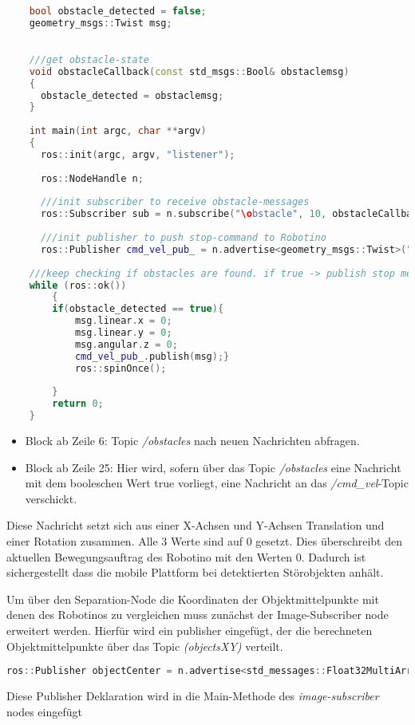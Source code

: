 	\newpage
	\begin{lstlisting}[language=C++]

	bool obstacle_detected = false;
	geometry_msgs::Twist msg;
	

	///get obstacle-state
	void obstacleCallback(const std_msgs::Bool& obstaclemsg)
	{
	  obstacle_detected = obstaclemsg;
	}
	
	int main(int argc, char **argv)
	{
	  ros::init(argc, argv, "listener");
	
	  ros::NodeHandle n;
	
      ///init subscriber to receive obstacle-messages
	  ros::Subscriber sub = n.subscribe("\obstacle", 10, obstacleCallback);
	
	  ///init publisher to push stop-command to Robotino
	  ros::Publisher cmd_vel_pub_ = n.advertise<geometry_msgs::Twist>("/cmd_vel", 1, true);
	
	///keep checking if obstacles are found. if true -> publish stop message
	while (ros::ok())
		{
		if(obstacle_detected == true){
			msg.linear.x = 0;
			msg.linear.y = 0;
			msg.angular.z = 0;
			cmd_vel_pub_.publish(msg);}
			ros::spinOnce();
	
		}
		return 0;
	}

	\end{lstlisting}
	
	\begin{itemize}
	\item Block ab Zeile 6: Topic \textit{/obstacles} nach neuen Nachrichten abfragen.
	\item Block ab Zeile 25: Hier wird, sofern über das Topic \textit{/obstacles} eine Nachricht mit dem booleschen Wert true vorliegt, eine Nachricht an das \textit{/cmd\_vel}-Topic verschickt.
	\end{itemize}
	 Diese Nachricht setzt sich aus einer X-Achsen und Y-Achsen Translation und einer Rotation zusammen. Alle 3 Werte sind auf 0 gesetzt. Dies überschreibt den aktuellen Bewegungsauftrag des Robotino mit den Werten 0. Dadurch ist sichergestellt dass die mobile Plattform bei detektierten Störobjekten anhält.
	 
	 Um über den Separation-Node die Koordinaten der Objektmittelpunkte mit denen des Robotinos zu vergleichen muss zunächst der Image-Subscriber node erweitert werden. Hierfür wird ein publisher eingefügt, der die berechneten Objektmittelpunkte über das Topic \textit{(objectsXY)} verteilt.
	 \begin{lstlisting}[language = C++]	 
	 ros::Publisher objectCenter = n.advertise<std_messages::Float32MultiArray>("/objectsXY", 1, true);
 	 \end{lstlisting}
	 Diese Publisher Deklaration wird in die Main-Methode des \textit{image-subscriber} nodes eingefügt
	 
